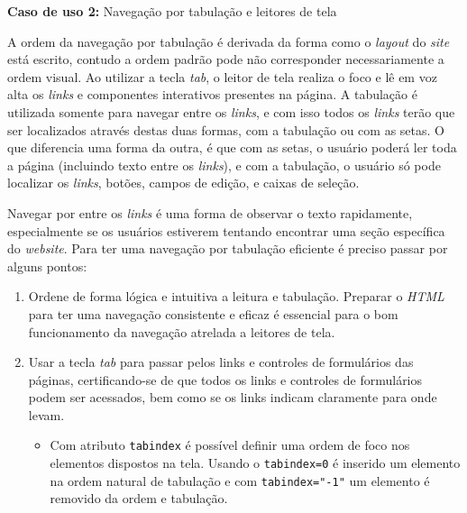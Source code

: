 {{\vspace{1.5cm}
{\centerline{\textbf{Caso de uso 2:}  Navegação por tabulação e leitores de tela}}
{
{
A ordem da navegação por tabulação é derivada da forma como o \textit{layout} do \textit{site} está escrito, contudo a ordem padrão pode não corresponder necessariamente a ordem visual. Ao utilizar a tecla \textit{tab}, o leitor de tela realiza o foco e lê em voz alta os \textit{links} e componentes interativos presentes na página.  A tabulação é utilizada somente para navegar entre os \textit{links}, e com isso todos os \textit{links} terão que ser localizados através destas duas formas, com a tabulação ou com as setas. O que diferencia uma forma da outra, é que com as setas, o usuário poderá ler toda a página (incluindo texto entre os \textit{links}), e com a tabulação, o usuário só pode localizar os \textit{links}, botões, campos de edição, e caixas de seleção.


Navegar por entre os \textit{links} é uma forma de observar o texto rapidamente, especialmente se os usuários estiverem tentando encontrar uma seção específica do \textit{website}. Para ter uma navegação por tabulação eficiente é preciso passar por alguns pontos: 
\begin{enumerate}
    \item Ordene de forma lógica e intuitiva a leitura e tabulação. Preparar o \textit{HTML}\cite{HTML} para ter uma navegação consistente e eficaz é essencial para o bom funcionamento da navegação atrelada a leitores de tela. 
    \item Usar a tecla \textit{tab} para passar pelos links e controles de formulários
    das páginas, certificando-se de que todos os links e controles de formulários podem ser acessados, bem como se os links indicam claramente para onde levam. 
    \begin{itemize}
        \item Com atributo \lstinline{tabindex} é possível definir uma ordem de foco nos elementos dispostos na tela. Usando o \lstinline{tabindex=0} é inserido um elemento na ordem natural de tabulação e com \lstinline{tabindex="-1"} um elemento é removido da ordem e tabulação.


\end{itemize}
\end{enumerate}}}}}
